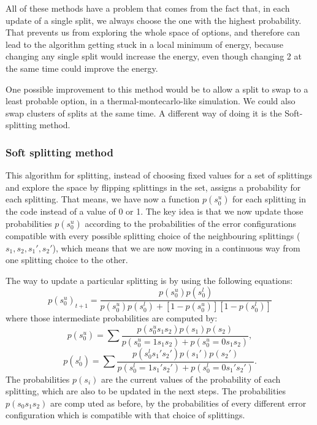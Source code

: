 \documentclass[a4paper,12pt]{article}
\begin{document}
All of these methods have a problem that comes from the fact that, in each update of a single split, we always choose the one with the highest probability. That prevents us from exploring the whole space of options, and therefore can lead to the algorithm getting stuck in a local minimum of energy, because changing any single split would increase the energy, even though changing 2 at the same time could improve the energy. 

One possible improvement to this method would be to allow a split to swap to a least probable option, in a thermal-montecarlo-like simulation. We could also swap clusters of splits at the same time. A different way of doing it is the Soft-splitting method.

\subsubsection{Soft splitting method}

This algorithm for splitting, instead of choosing fixed values for a set of splittings and explore the space by flipping splittings in the set, assigns a probability for each splitting. That means, we have now a function $p(s_0^u)$ for each splitting in the code instead of a value of 0 or 1. The key idea is that we now update those probabilities $p(s_0^u)$ according to the probabilities of the error configurations compatible with every possible splitting choice of the neighbouring splittings ($s_1,s_2,s_1',s_2'$), which means that we are now moving in a continuous way from one splitting choice to the other. 

The way to update a particular splitting is by using the following equations:
\begin{equation}
p(s_0^u)_{t+1}= \frac{p(s_0^u)p(s_0^l)}{p(s_0^u)p(s_0^l)+[1-p(s_0^u)][1-p(s_0^l)]}
\end{equation}
where those intermediate probabilities are computed by:
\begin{equation}
p(s_0^u)=\sum \frac{p(s_0^us_1s_2)p(s_1)p(s_2)}{p(s_0^u=1s_1s_2)+p(s_0^u=0s_1s_2)},
\end{equation}
\begin{equation}
p(s_0^l)=\sum \frac{p(s_0^ls_1's_2')p(s_1')p(s_2')}{p(s_0^l=1s_1's_2')+p(s_0^l=0s_1's_2')}.
\end{equation}
The probabilities $p(s_i)$ are the current values of the probability of each splitting, which are also to be updated in the next steps. The probabilities $p(s_0s_1s_2)$ are comp
uted as before, by the probabilities of every different error configuration which is compatible with that choice of splittings.
\end{document}
